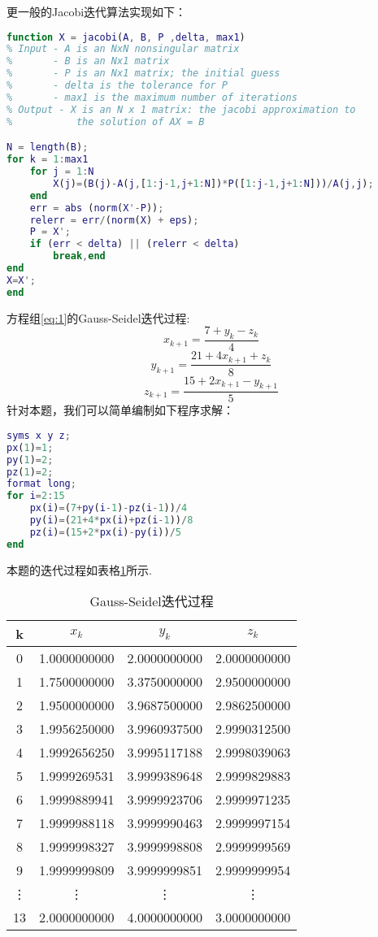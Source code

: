 \documentclass[UTF8]{ctexart}
\begin{document}
更一般的Jacobi迭代算法实现如下：\\
\begin{lstlisting}[language=matlab]
function X = jacobi(A, B, P ,delta, max1)
% Input - A is an NxN nonsingular matrix
%       - B is an Nx1 matrix
%       - P is an Nx1 matrix; the initial guess
%       - delta is the tolerance for P
%       - max1 is the maximum number of iterations
% Output - X is an N x 1 matrix: the jacobi approximation to
%           the solution of AX = B

N = length(B);
for k = 1:max1
	for j = 1:N
		X(j)=(B(j)-A(j,[1:j-1,j+1:N])*P([1:j-1,j+1:N]))/A(j,j);
	end
	err = abs (norm(X'-P));
	relerr = err/(norm(X) + eps);
	P = X';
	if (err < delta) || (relerr < delta)
		break,end
end
X=X';
end
\end{lstlisting}
方程组\ref{eq:1}的Gauss-Seidel迭代过程:\\
\[x_{k+1}=\frac{7+y_k-z_k}{4}\]
\[y_{k+1}=\frac{21+4x_{k+1}+z_k}{8}\]
\[z_{k+1}=\frac{15+2x_{k+1}-y_{k+1}}{5}\]
针对本题，我们可以简单编制如下程序求解：\\
\begin{lstlisting}[language=matlab]
syms x y z;
px(1)=1;
py(1)=2;
pz(1)=2;
format long;
for i=2:15
	px(i)=(7+py(i-1)-pz(i-1))/4
	py(i)=(21+4*px(i)+pz(i-1))/8
	pz(i)=(15+2*px(i)-py(i))/5
end
\end{lstlisting}
本题的迭代过程如表格\ref{tab:t2}所示.\\
\begin{table}[h]
	\caption{Gauss-Seidel迭代过程}
	\label{tab:t2}
	\centering
	\begin{tabular}{c|c|c|c}
		\hline
		k  &  $x_k$  & $y_k$  & $z_k$\\
		\hline
		0   & 1.0000000000 & 2.0000000000 & 2.0000000000 \\
		1	& 1.7500000000 & 3.3750000000 & 2.9500000000 \\
		2	& 1.9500000000 & 3.9687500000 & 2.9862500000 \\
		3	& 1.9956250000 & 3.9960937500 & 2.9990312500 \\
		4	& 1.9992656250 & 3.9995117188 & 2.9998039063 \\
		5	& 1.9999269531 & 3.9999389648 & 2.9999829883 \\
		6	& 1.9999889941 & 3.9999923706 & 2.9999971235 \\
		7	& 1.9999988118 & 3.9999990463 & 2.9999997154 \\
		8	& 1.9999998327 & 3.9999998808 & 2.9999999569 \\
		9	& 1.9999999809 & 3.9999999851 & 2.9999999954 \\
		\vdots & \vdots & \vdots & \vdots \\
		13  & 2.0000000000 & 4.0000000000 & 3.0000000000 \\
		\hline
	\end{tabular}
\end{table}
\end{document}
